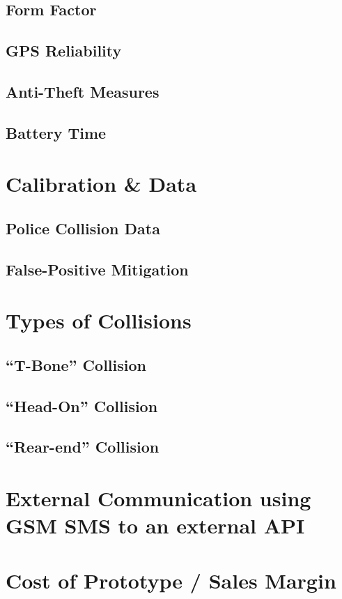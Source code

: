\documentclass[titlepage]{article}   	%
\begin{document}
\subsection{Form Factor}
\subsection{GPS Reliability}
\subsection{Anti-Theft Measures}
\subsection{Battery Time}

\section{Calibration \& Data}
\subsection{Police Collision Data}
\subsection{False-Positive Mitigation}

\section{Types of Collisions}
\subsection{``T-Bone'' Collision}
\subsection{``Head-On'' Collision}
\subsection{``Rear-end'' Collision}

\section[External Communication]{External Communication using GSM SMS to an external API}

\section{Cost of Prototype / Sales Margin}
\end{document}
